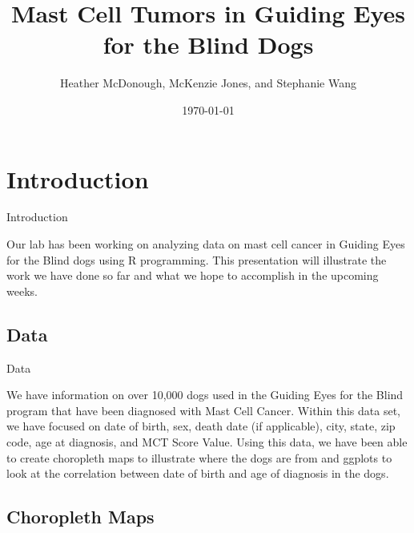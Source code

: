 \documentclass{beamer}
\title[Kvam Presentation 1]{Mast Cell Tumors in Guiding Eyes for the Blind Dogs}
\author{Heather McDonough, McKenzie Jones, and Stephanie Wang}
\institute{University of Richmond}
\date{\today}
\begin{document}
\begin{frame}
  \titlepage
\end{frame}


\section{Introduction}

\begin{frame}{Introduction}

Our lab has been working on analyzing data on mast cell cancer in Guiding Eyes for the Blind dogs using R programming. This presentation will illustrate the work we have done so far and what we hope to accomplish in the upcoming weeks. 



\end{frame}


\subsection{Data}
\begin{frame}{Data}

We have information on over 10,000 dogs used in the Guiding Eyes for the Blind program that have been diagnosed with Mast Cell Cancer. Within this data set, we have focused on date of birth, sex, death date (if applicable), city, state, zip code, age at diagnosis, and MCT Score Value. Using this data, we have been able to create choropleth maps to illustrate where the dogs are from and ggplots to look at the correlation between date of birth and age of diagnosis in the dogs. 

\end{frame}

\subsection{Choropleth Maps}
\end{document}
